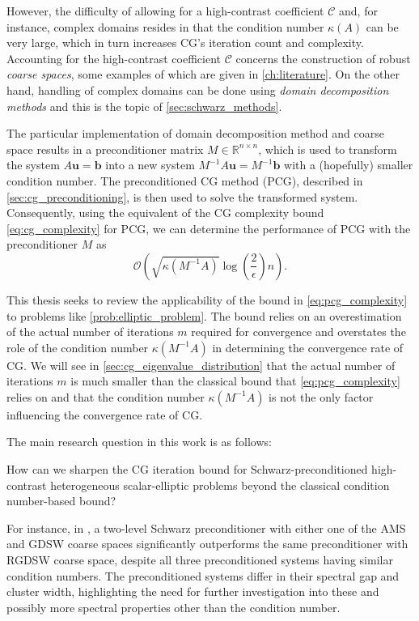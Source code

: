 However, the difficulty of allowing for a high-contrast coefficient $\mathcal{C}$ and, for instance, complex domains resides in that the condition number $\kappa(A)$ can be very large, which in turn increases CG's iteration count and complexity. Accounting for the high-contrast coefficient $\mathcal{C}$ concerns the construction of robust \textit{coarse spaces}, some examples of which are given in \cref{ch:literature}. On the other hand, handling of complex domains can be done using \textit{domain decomposition methods} and this is the topic of \cref{sec:schwarz_methods}. 

The particular implementation of domain decomposition method and coarse space results in a preconditioner matrix $M\in\mathbb{R}^{n \times n}$, which is used to transform the system $A\mathbf{u} = \mathbf{b}$ into a new system $M^{-1}A\mathbf{u} = M^{-1}\mathbf{b}$ with a (hopefully) smaller condition number. The preconditioned CG method (PCG), described in \cref{sec:cg_preconditioning}, is then used to solve the transformed system. Consequently, using the equivalent of the CG complexity bound \cref{eq:cg_complexity} for PCG, we can determine the performance of PCG with the preconditioner $M$ as
\begin{equation}
  \mathcal{O}\left(\sqrt{\kappa(M^{-1}A)}\log\left(\frac{2}{\epsilon}\right)n\right).
  \label{eq:pcg_complexity}
\end{equation}

This thesis seeks to review the applicability of the bound in \cref{eq:pcg_complexity} to problems like \cref{prob:elliptic_problem}. The bound relies on an overestimation of the actual number of iterations $m$ required for convergence and overstates the role of the condition number $\kappa(M^{-1}A)$ in determining the convergence rate of CG. We will see in \cref{sec:cg_eigenvalue_distribution} that the actual number of iterations $m$ is much smaller than the classical bound that \cref{eq:pcg_complexity} relies on and that the condition number $\kappa(M^{-1}A)$ is not the only factor influencing the convergence rate of CG. 

The main research question in this work is as follows:
\begin{researchq} \label{rq:main}
    \par
    How can we sharpen the CG iteration bound for Schwarz-preconditioned high-contrast heterogeneous scalar-elliptic problems beyond the classical condition number-based bound?
\end{researchq}
For instance, in \cite{ams_coarse_space_comp_study_Alves2024}, a two-level Schwarz preconditioner with either one of the AMS and GDSW coarse spaces significantly outperforms the same preconditioner with RGDSW coarse space, despite all three preconditioned systems having similar condition numbers. The preconditioned systems differ in their spectral gap and cluster width, highlighting the need for further investigation into these and possibly more spectral properties other than the condition number.

